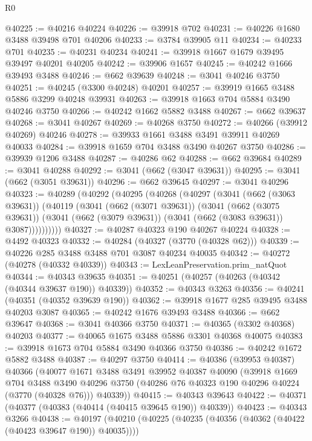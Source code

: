 \begin{lexlean}{R0}
\begin{coremodule}
@40225 := @40216 @40224
@40226 := @39918 @702
@40231 := @40226 @1680 @3488 @39498 @701 @40206
@40233 := @3784 @39905 @11
@40234 := @40233 @701
@40235 := @40231 @40234
@40241 := @39918 @1667 @1679 @39495 @39497 @40201 @40205
@40242 := @39906 @1657
@40245 := @40242 @1666 @39493 @3488
@40246 := @662 @39639
@40248 := @3041 @40246 @3750
@40251 := @40245 (@3300 @40248) @40201
@40257 := @39919 @1665 @3488 @5886 @3299 @40248 @39931
@40263 := @39918 @1663 @704 @5884 @3490 @40246 @3750
@40266 := @40242 @1662 @5882 @3488
@40267 := @662 @39637
@40268 := @3041 @40267
@40269 := @40268 @3750
@40272 := @40266 (@39912 @40269) @40246
@40278 := @39933 @1661 @3488 @3491 @39911 @40269 @40033
@40284 := @39918 @1659 @704 @3488 @3490 @40267 @3750
@40286 := @39939 @1206 @3488
@40287 := @40286 @62
@40288 := @662 @39684
@40289 := @3041 @40288
@40292 := @3041 (@662 (@3047 @39631))
@40295 := @3041 (@662 (@3051 @39631))
@40296 := @662 @39645
@40297 := @3041 @40296
@40323 := @40289
    (@40292
      (@40295
        (@40268
          (@40297
            (@3041
              (@662 (@3063 @39631))
              (@40119
                (@3041
                  (@662 (@3071 @39631))
                  (@3041
                    (@662 (@3075 @39631))
                    (@3041 (@662 (@3079 @39631)) (@3041 (@662 (@3083 @39631)) @3087))))))))))
@40327 := @40287 @40323 @190 @40267 @40224
@40328 := @4492 @40323
@40332 := @40284 (@40327 (@3770 (@40328 @62)))
@40339 := @40226 @285 @3488 @3488 @701 @3087 @40234 @40035
@40342 := @40272 (@40278 (@40332 @40339))
@40343 := LexLeanPreservation.prim_natQuot
@40344 := @40343 @39635
@40351 := @40251 (@40257 (@40263 (@40342 (@40344 @39637 @190)) @40339))
@40352 := @40343 @3263
@40356 := @40241 (@40351 (@40352 @39639 @190))
@40362 := @39918 @1677 @285 @39495 @3488 @40203 @3087
@40365 := @40242 @1676 @39493 @3488
@40366 := @662 @39647
@40368 := @3041 @40366 @3750
@40371 := @40365 (@3302 @40368) @40203
@40377 := @40065 @1675 @3488 @5886 @3301 @40368 @40075
@40383 := @39918 @1673 @704 @5884 @3490 @40366 @3750
@40386 := @40242 @1672 @5882 @3488
@40387 := @40297 @3750
@40414 := @40386
    (@39953 @40387)
    @40366
    (@40077
      @1671
      @3488
      @3491
      @39952
      @40387
      @40090
      (@39918
        @1669
        @704
        @3488
        @3490
        @40296
        @3750
        (@40286 @76 @40323 @190 @40296 @40224 (@3770 (@40328 @76)))
        @40339))
@40415 := @40343 @39643
@40422 := @40371 (@40377 (@40383 (@40414 (@40415 @39645 @190)) @40339))
@40423 := @40343 @3266
@40438 := @40197
    (@40210
      (@40225 (@40235 (@40356 (@40362 (@40422 (@40423 @39647 @190)) @40035))))

\end{coremodule}
\end{lexlean}
